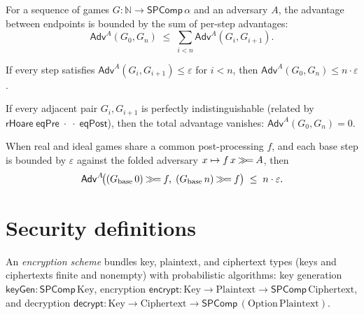 \begin{theorem}
  \label{thm:advantage-hybrid-dep}
  \leanok
  For a sequence of games $G : \mathbb{N} \to \mathsf{SPComp}\,\alpha$ and an
  adversary $A$, the advantage between endpoints is bounded by the sum of per-step
  advantages:
  \[
    \mathsf{Adv}^A(G_0, G_n)
      \;\le\; \sum_{i < n} \mathsf{Adv}^A(G_i, G_{i+1}).
  \]
\end{theorem}

\begin{theorem}
  \label{thm:advantage-hybrid-uniform}
  \leanok
  If every step satisfies $\mathsf{Adv}^A(G_i, G_{i+1}) \le \varepsilon$ for $i < n$,
  then $\mathsf{Adv}^A(G_0, G_n) \le n \cdot \varepsilon$.
\end{theorem}

\begin{theorem}
  \label{thm:advantage-hybrid-zero}
  \leanok
  If every adjacent pair $G_i, G_{i+1}$ is perfectly indistinguishable (related by
  $\mathsf{rHoare}\;\mathsf{eqPre}\;\cdot\;\cdot\;\mathsf{eqPost}$), then the total
  advantage vanishes: $\mathsf{Adv}^A(G_0, G_n) = 0$.
\end{theorem}

\begin{theorem}
  \label{thm:advantage-hybrid-factored}
  \leanok
  When real and ideal games share a common post-processing $f$, and each base step
  is bounded by $\varepsilon$ against the folded adversary $x \mapsto f\,x \mathbin{\gg\!=} A$,
  then
  \[
    \mathsf{Adv}^A\!\bigl((G_{\mathrm{base}}\,0) \mathbin{\gg\!=} f,\;
      (G_{\mathrm{base}}\,n) \mathbin{\gg\!=} f\bigr) \;\le\; n \cdot \varepsilon.
  \]
\end{theorem}

\section{Security definitions}

\begin{definition}
  \label{def:encscheme}
  \leanok
  An \emph{encryption scheme} bundles key, plaintext, and ciphertext types (keys and
  ciphertexts finite and nonempty) with probabilistic algorithms: key generation
  $\mathsf{keyGen} : \mathsf{SPComp}\,\mathrm{Key}$, encryption
  $\mathsf{encrypt} : \mathrm{Key} \to \mathrm{Plaintext} \to \mathsf{SPComp}\,\mathrm{Ciphertext}$,
  and decryption
  $\mathsf{decrypt} : \mathrm{Key} \to \mathrm{Ciphertext} \to \mathsf{SPComp}\,(\mathrm{Option}\,\mathrm{Plaintext})$.
\end{definition}

